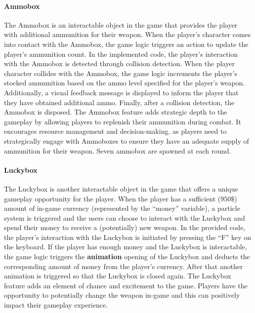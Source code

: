 \documentclass[12pt,a4paper,oneside]{article}
\theoremstyle{definition}
\begin{document}
\paragraph{Ammobox} The Ammobox is an interactable object in the game that provides the player with additional ammunition for their weapon. When the player's character comes into contact with the Ammobox, the game logic triggers an action to update the player's ammunition count.
In the implemented code, the player's interaction with the Ammobox is detected through collision detection. When the player character collides with the Ammobox, the game logic increments the player's stocked ammunition based on the ammo level specified for the player's weapon. Additionally, a visual feedback message is displayed to inform the player that they have obtained additional ammo. Finally, after a collision detection, the Ammobox is disposed.
The Ammobox feature adds strategic depth to the gameplay by allowing players to replenish their ammunition during combat. It encourages resource management and decision-making, as players need to strategically engage with Ammoboxes to ensure they have an adequate supply of ammunition for their weapon. Seven ammobox are spawned at each round.

\paragraph{Luckybox} The Luckybox is another interactable object in the game that offers a unique gameplay opportunity for the player. When the player has a sufficient ($950\$$) amount of in-game currency (represented by the ``money'' variable), a particle system is triggered and the users can choose to interact with the Luckybox and spend their money to receive a (potentially) new weapon.
In the provided code, the player's interaction with the Luckybox is initiated by pressing the ``F'' key on the keyboard. If the player has enough money and the Luckybox is interactable, the game logic triggers the \textbf{animation} opening of the Luckybox and deducts the corresponding amount of money from the player's currency. After that another animation is triggered so that the Luckybox is closed again.
The Luckybox feature adds an element of chance and excitement to the game. Players have the opportunity to potentially change the weapon in-game and this can positively impact their gameplay experience. 
\end{document}
